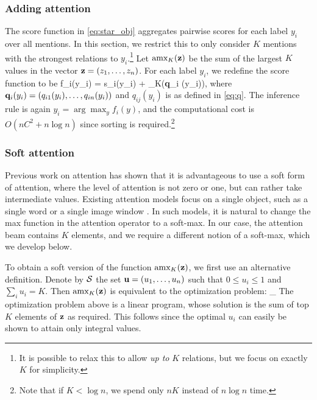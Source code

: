  

\subsubsection{Adding attention \label{sec:add_attention}}
The score function in \eqref{eq:star_obj} aggregates pairwise scores for each label $y_i$ over all mentions. In this section, we restrict this to only consider $K$ mentions with the strongest relations to $y_i$.\footnote{It is possible to relax this to allow {\em up to} $K$ relations, but we focus on exactly $K$ for simplicity.} 
  Let $\text{amx}_K({\bf z})$  be the sum of the largest $K$ values in the vector
${\bf z} = (z_1,\ldots,z_n)$.  For each label $y_i$,
we redefine the score function to be
\be
f_i(y_i) = s_i(y_i) + \amax_K({\bf q}_i (y_i)),
\label{eq:amax_obj}
\ee
where ${\bf q}_i(y_i) = (q_{i1}(y_i), \ldots, q_{in}(y_i))$ and $q_{ij}(y_i)$ is as defined in \eqref{eq:q}.
The inference rule is again $y_i = \arg\max_y f_i(y)$, and the computational cost is $O(nC^2+ n\log{n})$ since sorting is required.\footnote{Note that if $K < \log{n}$, we spend only $nK$ instead of $n\log{n}$ time.}


\subsubsection{Soft attention}
\label{sec:soft_attention}

Previous work on attention has shown that it is advantageous to use a soft form of attention, where the level of attention is not zero or one, but can rather take intermediate values. Existing attention models focus on a single object, such as a single word \cite{bahdanau2014neural} or a single image window \cite{xu2015show}. In such models,
 it is natural to change the max function in the attention operator to a soft-max. In our case, the attention beam contains $K$ elements, and we require a different notion of a soft-max, which we develop below.

\newcommand{\cS}{{\cal S}}
\newcommand{\xx}{{\mathbf{x}}}
\newcommand{\zz}{{\mathbf{z}}}
To obtain a soft version of the function  $\text{amx}_K({\bf z})$, we first use an alternative definition. Denote by $\cS$
the set ${\bf u} = (u_1,\ldots,u_n)$ such that $0\leq u_i \leq 1$ and $\sum_i u_i = K$. Then $\text{amx}_K({\bf z})$ is equivalent to the optimization problem:
\be
 \max_{ 
  \in \cS
 }  
\ee
The optimization problem above is a linear program, whose solution is the sum of top $K$ elements of ${\bf z}$ as required. This follows since the optimal $u_i$ can easily be shown to attain only integral values. %

